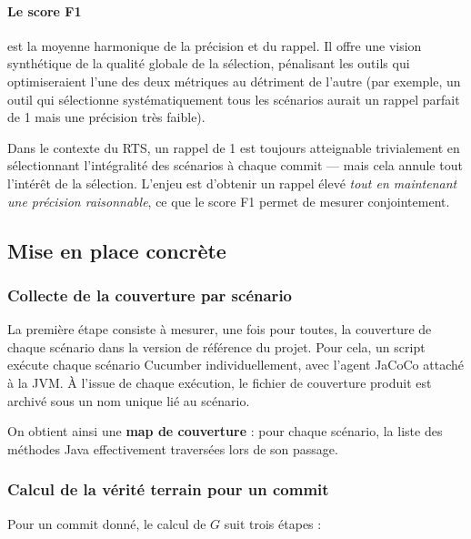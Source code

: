 \documentclass[12pt,a4paper]{article}
\begin{document}
\paragraph{Le score F1} est la moyenne harmonique de la précision et du
rappel. Il offre une vision synthétique de la qualité globale de la
sélection, pénalisant les outils qui optimiseraient l'une des deux
métriques au détriment de l'autre (par exemple, un outil qui sélectionne
systématiquement tous les scénarios aurait un rappel parfait de 1 mais
une précision très faible).

\begin{attention}
Dans le contexte du RTS, un rappel de 1 est toujours atteignable
trivialement en sélectionnant l'intégralité des scénarios à chaque
commit --- mais cela annule tout l'intérêt de la sélection. L'enjeu est
d'obtenir un rappel élevé \emph{tout en maintenant une précision
raisonnable}, ce que le score F1 permet de mesurer conjointement.
\end{attention}

\subsection{Mise en place concrète}

\subsubsection{Collecte de la couverture par scénario}

La première étape consiste à mesurer, une fois pour toutes, la couverture
de chaque scénario dans la version de référence du projet. Pour cela, un
script exécute chaque scénario Cucumber individuellement, avec l'agent
JaCoCo attaché à la JVM. À l'issue de chaque exécution, le fichier de
couverture produit est archivé sous un nom unique lié au scénario.

On obtient ainsi une \textbf{map de couverture} : pour chaque scénario,
la liste des méthodes Java effectivement traversées lors de son passage.

\subsubsection{Calcul de la vérité terrain pour un commit}

Pour un commit donné, le calcul de $G$ suit trois étapes :
\end{document}
